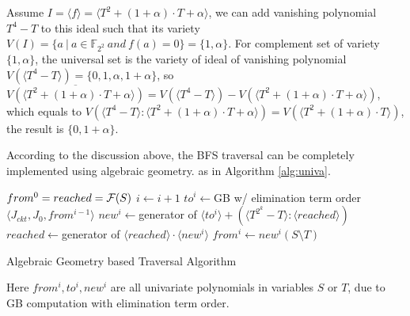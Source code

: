 Assume $I = \langle f\rangle  = \langle T^2 +
(1+\alpha)\cdot T+\alpha\rangle $,  we can add vanishing polynomial
$T^4 - T$ to this ideal such that its variety  $V(I) = \{a\ |\ a \in
\mathbb{F}_{2^2}\ and\ f(a) = 0\} = \{1, \alpha\}$. For complement set
of variety $\{1, \alpha\}$, the universal set is the variety of ideal
of vanishing polynomial $V(\langle T^4-T\rangle ) =
\{0,1,\alpha,1+\alpha\}$, 
so $\overline{V(\langle T^2 + (1+\alpha)\cdot T+\alpha\rangle )} = V(\langle T^4-T\rangle ) - V(\langle T^2 + (1+\alpha)\cdot T+\alpha\rangle )$,
which equals to $V(\langle T^4-T\rangle :\langle T^2 + (1+\alpha)\cdot T+\alpha\rangle ) = V(\langle T^2+(1+\alpha)\cdot T\rangle )$,
the result is $\{0,1+\alpha\}$.

According to the discussion above, the BFS traversal can be completely implemented using algebraic geometry.
as in Algorithm \ref{alg:univa}.

\begin{algorithm}[hbt]
\SetAlgoNoLine

  $from^0 = reached = {\mathcal{F}}(S)$\;
  {
  	$i \gets i + 1$\;
	$to^i \gets$GB w/ elimination term order$\langle J_{ckt},J_0, from^{i-1}\rangle$\;
	$new^i \gets $generator of $\langle to^i\rangle + (\langle T^{2^k}-T\rangle:\langle reached\rangle)$\;
  	$reached \gets $generator of $\langle reached\rangle \cdot \langle new^i\rangle$\;
	$from^i \gets new^i(S\setminus T)$\;
  }
\caption {Algebraic Geometry based Traversal Algorithm}\label{alg:univa}
\end{algorithm}

Here $from^i, to^i, new^i$ are all univariate polynomials in variables $S$ or $T$, due to GB computation
with elimination term order.

